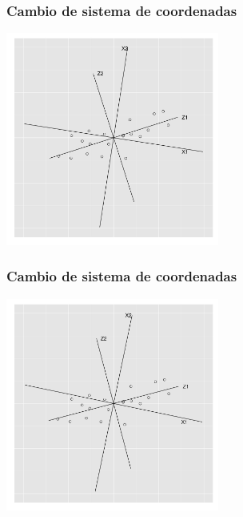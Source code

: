 \documentclass{beamer}
\begin{document}
\begin{frame}\frametitle{Cambio de sistema de coordenadas}
   \begin{overlayarea}{\textwidth}{8cm} 
 \begin{center}
   \includegraphics[height=7cm]{x1x2z1z2rotated04.png}
 \end{center}
   \end{overlayarea}
 \end{frame}
\begin{frame}\frametitle{Cambio de sistema de coordenadas}
   \begin{overlayarea}{\textwidth}{8cm} 
 \begin{center}
   \includegraphics[height=7cm]{x1x2z1z2rotated05.png}
 \end{center}
   \end{overlayarea}
 \end{frame}
\end{document}
